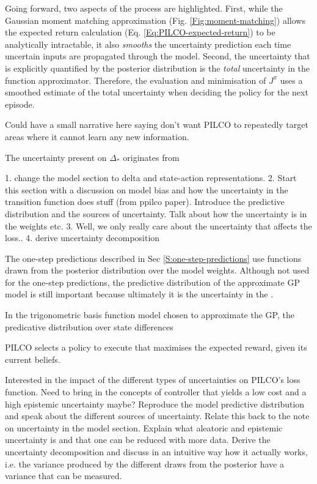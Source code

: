 Going forward, two aspects of the process are highlighted. First, while the Gaussian moment matching approximation (Fig. \ref{Fig:moment-matching}) allows the expected return calculation (Eq. \ref{Eq:PILCO-expected-return}) to be analytically intractable, it also \textit{smooths} the uncertainty prediction each time uncertain inputs are propagated through the model. Second, the uncertainty that is explicitly quantified by the posterior distribution is the \textit{total} uncertainty in the function approximator. Therefore, the evaluation and minimisation of $J^{\pi}$ uses a smoothed estimate of the total uncertainty when deciding the policy for the next episode. 

Could have a small narrative here saying don't want PILCO to repeatedly target areas where it cannot learn any new information.

The uncertainty present on $\Delta_{*}$ originates from

1. change the model section to delta and state-action representations. 
2. Start this section with a discussion on model bias and how the uncertainty in the transition function does stuff (from ppilco paper). 
Introduce the predictive distribution and the sources of uncertainty. Talk about how the uncertainty is in the weights etc.
3. Well, we only really care about the uncertainty that affects the loss..
4. derive uncertainty decomposition

The one-step predictions described in Sec \ref{S:one-step-predictions} use functions drawn from the posterior distribution over the model weights. Although not used for the one-step predictions, the predictive distribution of the approximate GP model is still important because ultimately it is the uncertainty in the .

In the trigonometric basis function model chosen to approximate the GP, the predicative distribution over state differences 

PILCO selects a policy to execute that maximises the expected reward, given its current beliefs. 

Interested in the impact of the different types of uncertainties on PILCO's loss function. Need to bring in the concepts of controller that yields a low cost and a high epistemic uncertainty maybe?
Reproduce the model predictive distribution and speak about the different sources of uncertainty. Relate this back to the note on uncertainty in the model section.
Explain what aleatoric and epistemic uncertainty is and that one can be reduced with more data.
Derive the uncertainty decomposition and discuss in an intuitive way how it actually works, i.e. the variance produced by the different draws from the posterior have a variance that can be measured.
